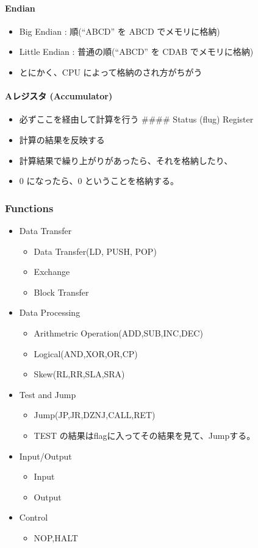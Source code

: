 \documentclass{jsarticle}
\begin{document}
\paragraph{Endian}

\begin{itemize}
\item
  Big Endian : 順(``ABCD'' を ABCD でメモリに格納)
\item
  Little Endian : 普通の順(``ABCD'' を CDAB でメモリに格納)
\item
  とにかく、CPU によって格納のされ方がちがう
\end{itemize}
\paragraph{Aレジスタ (Accumulator)}

\begin{itemize}
\item
  必ずここを経由して計算を行う \#\#\#\# Status (flug) Register
\item
  計算の結果を反映する
\item
  計算結果で繰り上がりがあったら、それを格納したり、
\item
  0 になったら、0 ということを格納する。
\end{itemize}
\subsubsection{Functions}

\begin{itemize}
\item
  Data Transfer
  \begin{itemize}
  \item
    Data Transfer(LD, PUSH, POP)
  \item
    Exchange
  \item
    Block Transfer
  \end{itemize}
\item
  Data Processing
  \begin{itemize}
  \item
    Arithmetric Operation(ADD,SUB,INC,DEC)
  \item
    Logical(AND,XOR,OR,CP)
  \item
    Skew(RL,RR,SLA,SRA)
  \end{itemize}
\item
  Test and Jump
  \begin{itemize}
  \item
    Jump(JP,JR,DZNJ,CALL,RET)
  \item
    TEST の結果はflagに入ってその結果を見て、Jumpする。
  \end{itemize}
\item
  Input/Output
  \begin{itemize}
  \item
    Input
  \item
    Output
  \end{itemize}
\item
  Control
  \begin{itemize}
  \item
    NOP,HALT
  \end{itemize}
\end{itemize}
\end{document}
